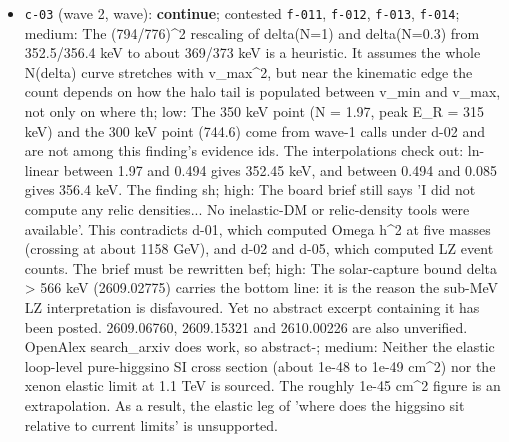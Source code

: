 \documentclass[11pt,a4paper]{article}
\begin{document}
\begin{itemize}
  \item \texttt{c-03} (wave 2, wave): \textbf{continue}; contested \texttt{f-011}, \texttt{f-012}, \texttt{f-013}, \texttt{f-014}; medium: The (794/776)\textasciicircum{}2 rescaling of delta(N=1) and delta(N=0.3) from 352.5/356.4 keV to about 369/373 keV is a heuristic. It assumes the whole N(delta) curve stretches with v\_max\textasciicircum{}2, but near the kinematic edge the count depends on how the halo tail is populated between v\_min and v\_max, not only on where th; low: The 350 keV point (N = 1.97, peak E\_R = 315 keV) and the 300 keV point (744.6) come from wave-1 calls under d-02 and are not among this finding's evidence ids. The interpolations check out: ln-linear between 1.97 and 0.494 gives 352.45 keV, and between 0.494 and 0.085 gives 356.4 keV. The finding sh; high: The board brief still says 'I did not compute any relic densities... No inelastic-DM or relic-density tools were available'. This contradicts d-01, which computed Omega h\textasciicircum{}2 at five masses (crossing at about 1158 GeV), and d-02 and d-05, which computed LZ event counts. The brief must be rewritten bef; high: The solar-capture bound delta \textgreater{} 566 keV (2609.02775) carries the bottom line: it is the reason the sub-MeV LZ interpretation is disfavoured. Yet no abstract excerpt containing it has been posted. 2609.06760, 2609.15321 and 2610.00226 are also unverified. OpenAlex search\_arxiv does work, so abstract-; medium: Neither the elastic loop-level pure-higgsino SI cross section (about 1e-48 to 1e-49 cm\textasciicircum{}2) nor the xenon elastic limit at 1.1 TeV is sourced. The roughly 1e-45 cm\textasciicircum{}2 figure is an extrapolation. As a result, the elastic leg of 'where does the higgsino sit relative to current limits' is unsupported.

\end{itemize}
\end{document}
